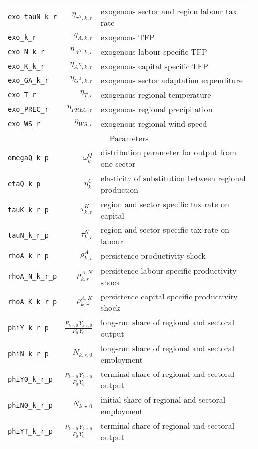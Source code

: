 \begin{center}
\begin{longtable}{lrl}
\texttt{exo\_tauN\_k\_r} & ${\eta_{\tau^{N},k,r}}$ & exogenous sector and region labour tax rate\\
\texttt{exo\_k\_r} & ${\eta_{A,k,r}}$ & exogenous TFP\\
\texttt{exo\_N\_k\_r} & ${\eta_{A^{N},k,r}}$ & exogenous labour specific TFP\\
\texttt{exo\_K\_k\_r} & ${\eta_{A^{K},k,r}}$ & exogenous capital specific TFP\\
\texttt{exo\_GA\_k\_r} & ${\eta_{G^{A},k,r}}$ & exogenous sector adaptation expenditure\\
\texttt{exo\_T\_r} & ${\eta_{T,r}}$ & exogenous regional temperature\\
\texttt{exo\_PREC\_r} & ${\eta_{PREC,r}}$ & exogenous regional precipitation\\
\texttt{exo\_WS\_r} & ${\eta_{WS,r}}$ & exogenous regional wind speed\\
\hline%
\multicolumn{3}{c}{Parameters}\\%
\hline%
\texttt{omegaQ\_k\_p} & ${\omega^{Q}_{k}}$ & distribution parameter for output from one sector\\
\texttt{etaQ\_k\_p} & ${\eta^{C}_{k}}$ & elasticity of substitution between regional production\\
\texttt{tauK\_k\_r\_p} & ${\tau^{K}_{k,r}}$ & region and sector specific tax rate on capital\\
\texttt{tauN\_k\_r\_p} & ${\tau^{N}_{k,r}}$ & region and sector specific tax rate on labour\\
\texttt{rhoA\_k\_r\_p} & ${\rho^{A}_{k,r}}$ & persistence productivity shock\\
\texttt{rhoA\_N\_k\_r\_p} & ${\rho^{A,N}_{k,r}}$ & persistence labour specific productivity shock\\
\texttt{rhoA\_K\_k\_r\_p} & ${\rho^{A,K}_{k,r}}$ & persistence capital specific productivity shock\\
\texttt{phiY\_k\_r\_p} & $\frac{P_{k,r,0} \, Y_{k,r,0}}{P_{0} \, Y_{0}}$ & long-run share of regional and sectoral output\\
\texttt{phiN\_k\_r\_p} & ${N_{k,r,0}}$ & long-run share of regional and sectoral employment\\
\texttt{phiY0\_k\_r\_p} & $\frac{P_{k,r,0} \, Y_{k,r,0}}{P_{0} \, Y_{0}}$ & terminal share of regional and sectoral output\\
\texttt{phiN0\_k\_r\_p} & ${N_{k,r,0}}$ & initial share of regional and sectoral employment\\
\texttt{phiYT\_k\_r\_p} & $\frac{P_{k,r,0} \, Y_{k,r,0}}{P_{0} \, Y_{0}}$ & terminal share of regional and sectoral output\\

\end{longtable}
\end{center}
